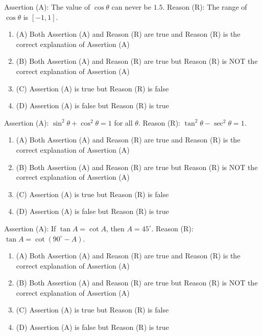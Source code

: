 \documentclass[12pt,a4paper]{exam}
\begin{document}
\begin{questions}
\question[1] Assertion (A): The value of $\cos \theta$ can never be $1.5$. Reason (R): The range of $\cos \theta$ is $[-1, 1]$.
\begin{enumerate}[label=(\Alph*)]
  \item (A) Both Assertion (A) and Reason (R) are true and Reason (R) is the correct explanation of Assertion (A)
  \item (B) Both Assertion (A) and Reason (R) are true but Reason (R) is NOT the correct explanation of Assertion (A)
  \item (C) Assertion (A) is true but Reason (R) is false
  \item (D) Assertion (A) is false but Reason (R) is true
\end{enumerate}
\vspace{0.15cm}

\question[1] Assertion (A): $\sin^2 \theta + \cos^2 \theta = 1$ for all $\theta$. Reason (R): $\tan^2 \theta - \sec^2 \theta = 1$.
\begin{enumerate}[label=(\Alph*)]
  \item (A) Both Assertion (A) and Reason (R) are true and Reason (R) is the correct explanation of Assertion (A)
  \item (B) Both Assertion (A) and Reason (R) are true but Reason (R) is NOT the correct explanation of Assertion (A)
  \item (C) Assertion (A) is true but Reason (R) is false
  \item (D) Assertion (A) is false but Reason (R) is true
\end{enumerate}
\vspace{0.15cm}

\question[1] Assertion (A): If $\tan A = \cot A$, then $A = 45^\circ$. Reason (R): $\tan A = \cot(90^\circ - A)$.
\begin{enumerate}[label=(\Alph*)]
  \item (A) Both Assertion (A) and Reason (R) are true and Reason (R) is the correct explanation of Assertion (A)
  \item (B) Both Assertion (A) and Reason (R) are true but Reason (R) is NOT the correct explanation of Assertion (A)
  \item (C) Assertion (A) is true but Reason (R) is false
  \item (D) Assertion (A) is false but Reason (R) is true
\end{enumerate}
\vspace{0.15cm}


\end{questions}
\end{document}
